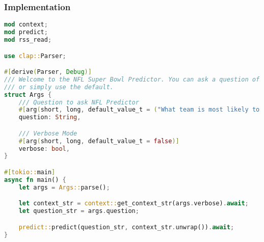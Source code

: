 \subsubsection{Implementation}
\begin{lstlisting}[language=rust]
mod context;
mod predict;
mod rss_read;

use clap::Parser;

#[derive(Parser, Debug)]
/// Welcome to the NFL Super Bowl Predictor. You can ask a question of your choosing, 
/// or simply use the default.
struct Args {
    /// Question to ask NFL Predictor
    #[arg(short, long, default_value_t = ("What team is most likely to win the upcoming Super Bowl?").to_string())]
    question: String,

    /// Verbose Mode
    #[arg(short, long, default_value_t = false)]
    verbose: bool,
}

#[tokio::main]
async fn main() {
    let args = Args::parse();

    let context_str = context::get_context_str(args.verbose).await;
    let question_str = args.question;

    predict::predict(question_str, context_str.unwrap()).await;
}
\end{lstlisting}

